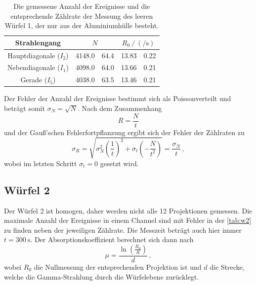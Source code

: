   \begin{table}[H]
    \centering
    \caption{Die gemessene Anzahl der Ereignisse und die entsprechende Zählrate der Messung des leeren Würfel 1, der nur aus der Aluminiumhülle besteht.}
    \label{tab:w1}
    \begin{tabular}{c S[table-format=4.1] @{${}\pm{}$} S[table-format=2.1] S[table-format=2.2] @{${}\pm{}$} S[table-format=1.2]}
        \toprule
        {Strahlengang} &  &  \\
        \midrule
        Hauptdiagonale ($I_2$) &  4148.0 & 64.4  &  13.83 & 0.22  \\ 
        Nebendiagonale ($I_1$) &  4098.0 & 64.0  &  13.66 & 0.21  \\ 
        Gerade ($I_5$)         &  4038.0 & 63.5  &  13.46 & 0.21  \\ 
        \bottomrule 
    \end{tabular}
  \end{table}

  \noindent Der Fehler der Anzahl der Ereignisse bestimmt sich als Poissonverteilt und beträgt somit $\sigma_N =\sqrt{N}$. Nach dem Zusammenhang 
  \begin{equation*}
    R = \frac{N}{t}
  \end{equation*}
  und der Gauß'schen Fehlerfortpflanzung ergibt sich der Fehler der Zählraten zu
  \begin{equation*}
    \sigma_R = \sqrt{\sigma_N^2 \left(\frac{1}{t}\right)^2 + \sigma_t \left(- \frac{N}{t^2}\right) } = \frac{\sigma_N}{t} \, ,
  \end{equation*}
  wobei im letzten Schritt $\sigma_t = 0 $ gesetzt wird. 
  
\subsection{Würfel 2}

  \noindent Der Würfel 2 ist homogen, daher werden nicht alle 12 Projektionen gemessen. Die maximale Anzahl der Ereignisse in einem Channel sind mit 
  Fehler in der \autoref{tab:w2} zu finden neben der jeweiligen Zählrate. Die Messzeit beträgt auch hier immer $t = \SI{300}{\second}$. Der 
  Absorptionskoeffizient berechnet sich dann nach 
  \begin{equation*}
    \mu = \frac{\ln\left(\frac{R_0}{R}\right)}{d} \, ,
  \end{equation*}
  wobei $R_0$ die Nullmessung der entsprechenden Projektion ist und $d$ die Strecke, welche die Gamma-Strahlung durch die Würfelebene zurücklegt. 
  
